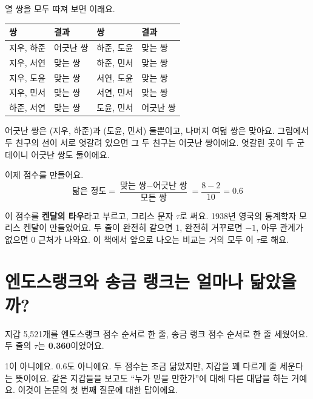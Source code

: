 열 쌍을 모두 따져 보면 이래요.

\begin{center}
\small
\begin{tabular}{@{}ll@{\qquad}ll@{}}
\toprule
쌍 & 결과 & 쌍 & 결과 \\
\midrule
지우, 하준 & \textcolor{roseline}{어긋난 쌍} & 하준, 도윤 & 맞는 쌍 \\
지우, 서연 & 맞는 쌍 & 하준, 민서 & 맞는 쌍 \\
지우, 도윤 & 맞는 쌍 & 서연, 도윤 & 맞는 쌍 \\
지우, 민서 & 맞는 쌍 & 서연, 민서 & 맞는 쌍 \\
하준, 서연 & 맞는 쌍 & 도윤, 민서 & \textcolor{roseline}{어긋난 쌍} \\
\bottomrule
\end{tabular}
\end{center}

어긋난 쌍은 (지우, 하준)과 (도윤, 민서) 둘뿐이고, 나머지 여덟 쌍은 맞아요.
그림에서 두 친구의 선이 서로 엇갈려 있으면 그 두 친구는 어긋난 쌍이에요.
엇갈린 곳이 두 군데이니 어긋난 쌍도 둘이에요.

이제 점수를 만들어요.
\[
\text{닮은 정도} = \frac{\text{맞는 쌍} - \text{어긋난 쌍}}{\text{모든 쌍}} = \frac{8-2}{10} = 0.6
\]

이 점수를 \textbf{켄달의 타우}라고 부르고, 그리스 문자 $\tau$로 써요.
1938년 영국의 통계학자 모리스 켄달이 만들었어요.
두 줄이 완전히 같으면 1, 완전히 거꾸로면 $-1$, 아무 관계가 없으면 0 근처가 나와요.
이 책에서 앞으로 나오는 비교는 거의 모두 이 $\tau$로 해요.

\section{엔도스랭크와 송금 랭크는 얼마나 닮았을까?}

지갑 5,521개를 엔도스랭크 점수 순서로 한 줄, 송금 랭크 점수 순서로 한 줄 세웠어요.
두 줄의 $\tau$는 \textbf{0.360}이었어요.

1이 아니에요.
0.6도 아니에요.
두 점수는 조금 닮았지만, 지갑을 꽤 다르게 줄 세운다는 뜻이에요.
같은 지갑들을 보고도 “누가 믿을 만한가”에 대해 다른 대답을 하는 거예요.
이것이 논문의 첫 번째 질문에 대한 답이에요.

